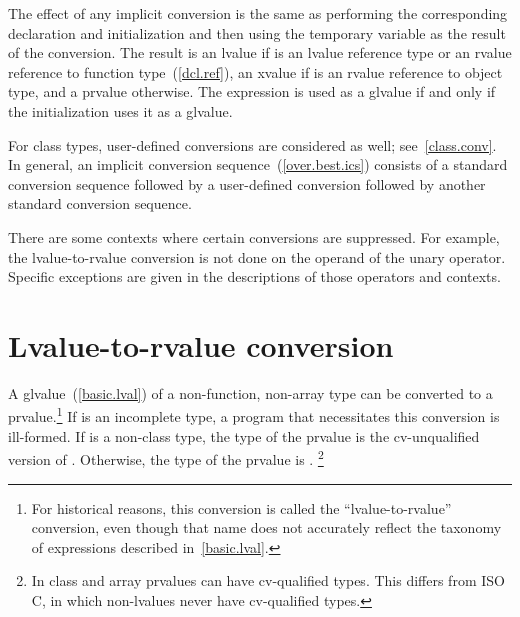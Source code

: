 \pnum
The effect of any implicit
conversion is the same as performing the corresponding declaration and initialization
and then using the temporary variable as the result of the conversion.
The result is an lvalue if  is an lvalue reference
type or an rvalue reference to function type~(\ref{dcl.ref}),
an xvalue if  is an rvalue reference to object type,
and a prvalue otherwise. The expression 
is used as a glvalue if and only if the initialization uses it as a glvalue.

\pnum
\begin{note}
For class types, user-defined conversions are considered as well;
see~\ref{class.conv}. In general, an implicit conversion
sequence~(\ref{over.best.ics}) consists of a standard conversion
sequence followed by a user-defined conversion followed by another
standard conversion sequence.
\end{note}

\pnum
\begin{note}
There are some contexts where certain conversions are suppressed. For
example, the lvalue-to-rvalue conversion is not done on the operand of
the unary \tcode{\&} operator. Specific exceptions are given in the
descriptions of those operators and contexts.
\end{note}

\section[conv.lval]{Lvalue-to-rvalue conversion}

\pnum
{}%
%
A glvalue~(\ref{basic.lval}) of a non-function, non-array type 
can be converted to
a prvalue.\footnote{For historical reasons, this conversion is called the ``lvalue-to-rvalue''
conversion, even though that name does not accurately reflect the taxonomy
of expressions described in~\ref{basic.lval}.}
If  is an incomplete type, a
program that necessitates this conversion is ill-formed. If 
is a non-class type, the type of the prvalue is
the cv-unqualified version of . Otherwise, the type of the
prvalue is .%
\footnote{In \Cpp class and array prvalues can have cv-qualified types.
This differs from ISO C, in which non-lvalues never have
cv-qualified types.}

